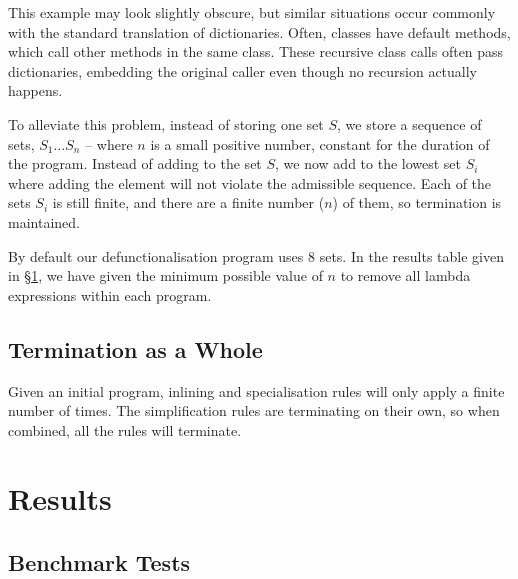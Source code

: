 \documentclass[preprint]{sigplanconf}
\begin{document}
This example may look slightly obscure, but similar situations occur commonly with the standard translation of dictionaries. Often, classes have default methods, which call other methods in the same class. These recursive class calls often pass dictionaries, embedding the original caller even though no recursion actually happens.

To alleviate this problem, instead of storing one set $S$, we store a sequence of sets, $S_1 \ldots S_n$ -- where $n$ is a small positive number, constant for the duration of the program. Instead of adding to the set $S$, we now add to the lowest set $S_i$ where adding the element will not violate the admissible sequence. Each of the sets $S_i$ is still finite, and there are a finite number ($n$) of them, so termination is maintained.

By default our defunctionalisation program uses 8 sets. In the results table given in \S\ref{sec:results}, we have given the minimum possible value of $n$ to remove all lambda expressions within each program.

\subsection{Termination as a Whole}

Given an initial program, inlining and specialisation rules will only apply a finite number of times. The simplification rules are terminating on their own, so when combined, all the rules will terminate.

\section{Results}
\label{sec:results}

\subsection{Benchmark Tests}
\end{document}
